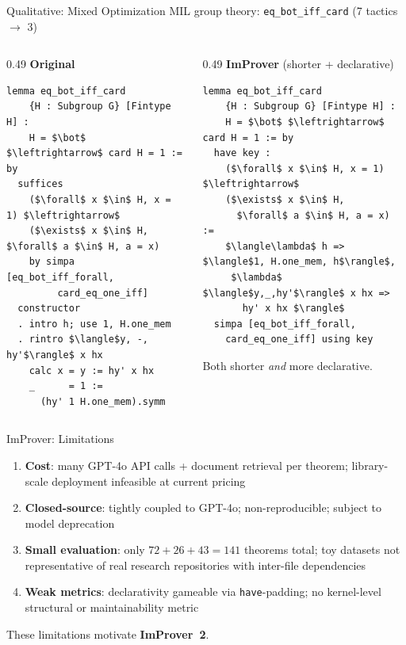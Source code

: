 \documentclass{beamer}
\newcommand{\bad}[1]{\textcolor{improverRed}{\textbf{#1}}}
\begin{document}
\begin{frame}[fragile]{Qualitative: Mixed Optimization}
\vspace{0.3em}
{\small MIL group theory: \texttt{eq\_bot\_iff\_card} (7 tactics $\to$ 3)}
\begin{columns}[T]
\begin{column}{0.49\textwidth}
\textbf{Original}
\begin{lstlisting}[basicstyle=\tiny\ttfamily]
lemma eq_bot_iff_card
    {H : Subgroup G} [Fintype H] :
    H = $\bot$ $\leftrightarrow$ card H = 1 := by
  suffices
    ($\forall$ x $\in$ H, x = 1) $\leftrightarrow$
    ($\exists$ x $\in$ H, $\forall$ a $\in$ H, a = x)
    by simpa [eq_bot_iff_forall,
         card_eq_one_iff]
  constructor
  . intro h; use 1, H.one_mem
  . rintro $\langle$y, -, hy'$\rangle$ x hx
    calc x = y := hy' x hx
    _      = 1 :=
      (hy' 1 H.one_mem).symm
\end{lstlisting}
\end{column}
\begin{column}{0.49\textwidth}
\textbf{ImProver} (shorter + declarative)
\begin{lstlisting}[basicstyle=\tiny\ttfamily]
lemma eq_bot_iff_card
    {H : Subgroup G} [Fintype H] :
    H = $\bot$ $\leftrightarrow$ card H = 1 := by
  have key :
    ($\forall$ x $\in$ H, x = 1) $\leftrightarrow$
    ($\exists$ x $\in$ H,
      $\forall$ a $\in$ H, a = x) :=
    $\langle\lambda$ h => $\langle$1, H.one_mem, h$\rangle$,
     $\lambda$ $\langle$y,_,hy'$\rangle$ x hx =>
       hy' x hx $\rangle$
  simpa [eq_bot_iff_forall,
    card_eq_one_iff] using key
\end{lstlisting}
\vspace{0.2em}
\small Both shorter \emph{and} more declarative.
\end{column}
\end{columns}
\end{frame}

\begin{frame}{ImProver: Limitations}
\vspace{0.2em}
\begin{enumerate}\setlength{\itemsep}{8pt}
  \item[\bad{1.}] \textbf{Cost}: many GPT-4o API calls + document retrieval per theorem; library-scale deployment infeasible at current pricing
  \item[\bad{2.}] \textbf{Closed-source}: tightly coupled to GPT-4o; non-reproducible; subject to model deprecation
  \item[\bad{3.}] \textbf{Small evaluation}: only $72 + 26 + 43 = 141$ theorems total; toy datasets not representative of real research repositories with inter-file dependencies
  \item[\bad{4.}] \textbf{Weak metrics}: declarativity gameable via \texttt{have}-padding; no kernel-level structural or maintainability metric
\end{enumerate}
\vspace{0.4em}
\begin{alertblock}{}
  \centering These limitations motivate \textbf{ImProver~2}.
\end{alertblock}
\end{frame}
\end{document}
